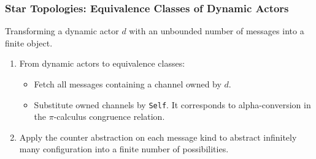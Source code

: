\documentclass{beamer}
\theoremstyle{remark}
\theoremstyle{definition}
\begin{document}
\begin{frame}
\frametitle{Star Topologies: Equivalence Classes of Dynamic Actors}
Transforming a dynamic actor $d$ with an unbounded number of messages into a \alert{finite object}.

\begin{enumerate}

\item From dynamic actors to equivalence classes:
\begin{itemize}
\item Fetch all messages containing a channel owned by $d$.
\item Substitute owned channels by \texttt{Self}.
It corresponds to alpha-conversion in the $\pi$-calculus congruence relation.
\end{itemize}

\item Apply the counter abstraction on each message kind to abstract infinitely many configuration into a finite number of possibilities.

\end{enumerate}

\end{frame}
\end{document}
